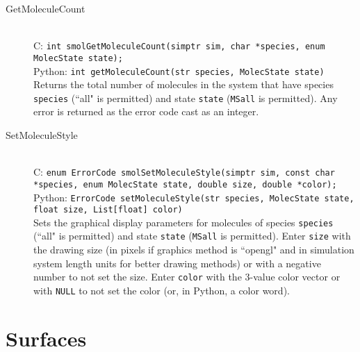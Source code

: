\documentclass {book}
\begin{document}
\begin{description}
\item[GetMoleculeCount]
\hfill \\
C: \texttt{int smolGetMoleculeCount(simptr sim, char *species, enum MolecState state);}\\
Python: \texttt{int getMoleculeCount(str species, MolecState state)}\\
Returns the total number of molecules in the system that have species \texttt{species} (``all" is permitted) and state \texttt{state} (\texttt{MSall} is permitted). Any error is returned as the error code cast as an integer.

\item[SetMoleculeStyle]
\hfill \\
C: \texttt{enum ErrorCode smolSetMoleculeStyle(simptr sim, const char *species, enum MolecState state, double size, double *color);}\\
Python: \texttt{ErrorCode setMoleculeStyle(str species, MolecState state, float size, List[float] color)}\\
Sets the graphical display parameters for molecules of species \texttt{species} (``all" is permitted) and state \texttt{state} (\texttt{MSall} is permitted). Enter \texttt{size} with the drawing size (in pixels if graphics method is ``opengl" and in simulation system length units for better drawing methods) or with a negative number to not set the size. Enter \texttt{color} with the 3-value color vector or with \texttt{NULL} to not set the color (or, in Python, a color word).

\end{description}

\section{Surfaces}
\end{document}
